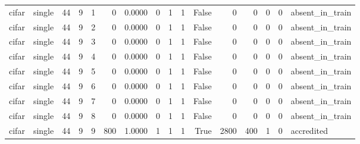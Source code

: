 \begin{tabular}{llrrrrrrrrrrrrrl}
cifar & single & 44 & 9 & 1 & 0 & 0.0000 & 0 & 1 & 1 & False & 0 & 0 & 0 & 0 & absent\_in\_train \\
cifar & single & 44 & 9 & 2 & 0 & 0.0000 & 0 & 1 & 1 & False & 0 & 0 & 0 & 0 & absent\_in\_train \\
cifar & single & 44 & 9 & 3 & 0 & 0.0000 & 0 & 1 & 1 & False & 0 & 0 & 0 & 0 & absent\_in\_train \\
cifar & single & 44 & 9 & 4 & 0 & 0.0000 & 0 & 1 & 1 & False & 0 & 0 & 0 & 0 & absent\_in\_train \\
cifar & single & 44 & 9 & 5 & 0 & 0.0000 & 0 & 1 & 1 & False & 0 & 0 & 0 & 0 & absent\_in\_train \\
cifar & single & 44 & 9 & 6 & 0 & 0.0000 & 0 & 1 & 1 & False & 0 & 0 & 0 & 0 & absent\_in\_train \\
cifar & single & 44 & 9 & 7 & 0 & 0.0000 & 0 & 1 & 1 & False & 0 & 0 & 0 & 0 & absent\_in\_train \\
cifar & single & 44 & 9 & 8 & 0 & 0.0000 & 0 & 1 & 1 & False & 0 & 0 & 0 & 0 & absent\_in\_train \\
cifar & single & 44 & 9 & 9 & 800 & 1.0000 & 1 & 1 & 1 & True & 2800 & 400 & 1 & 0 & accredited \\
\bottomrule
\end{tabular}
